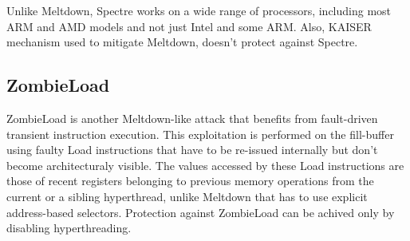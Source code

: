 \documentclass[sigconf]{acmart}
\begin{document}
Unlike Meltdown, Spectre works on a wide range of processors, including most ARM and AMD models and not just Intel and some ARM. Also, KAISER mechanism used to mitigate Meltdown, doesn't protect against Spectre. 

\subsection{ZombieLoad}

ZombieLoad is another Meltdown-like attack that benefits from fault-driven transient instruction execution. This exploitation is performed on the fill-buffer using faulty Load instructions that have to be re-issued internally but don't become architecturaly visible. The values accessed by these Load instructions are those of recent registers belonging to previous memory operations from the current or a sibling hyperthread, unlike Meltdown that has to use explicit address-based selectors. Protection against ZombieLoad can be achived only by disabling hyperthreading. 


\newpage



\appendix
\end{document}
